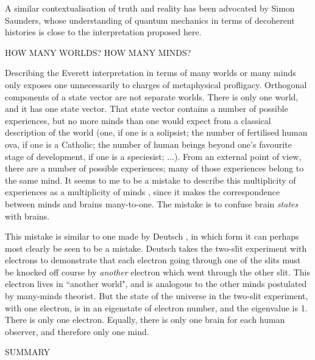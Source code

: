 \documentclass[12pt,a4paper,reqno]{article}
\renewcommand{\(}{\left(}
\renewcommand{\)}{\right)}
\newcommand{\<}{\langle}
\renewcommand{\>}{\rangle}
\theoremstyle{plain} %
\theoremstyle{definition}
\theoremstyle{remark}
\begin{document}
A similar contextualisation of truth and reality has been
advocated by Simon Saunders, whose understanding
of quantum mechanics in terms of decoherent
histories \cite{Saunders:Synthese1, Saunders:Synthese2, 
Saunders:Synthese3} is close to the interpretation proposed here.

\medskip
\begin{center}
HOW MANY WORLDS? HOW MANY MINDS?
\end{center}

Describing the Everett interpretation in terms
of many worlds or many minds only exposes one unnecessarily to charges of
metaphysical profligacy. Orthogonal components of a state vector are not
separate worlds. There is only one world, and it has one state vector.
That state vector contains a number of possible experiences, but no more
minds than one would expect from a classical description of the world
(one, if one is a solipsist; the number of fertilised human ova, if one
is a Catholic; the number of human beings beyond one's favourite stage
of development, if one is a speciesist; ...). From an
external point of view, there are a number of possible experiences; many
of those experiences belong to the same mind. It seems to me to be a
mistake to describe this multiplicity of experiences as a multiplicity of
minds \cite{Lockwood:manyminds, Albert:book, Donald:progress}, since it
makes the correspondence between minds and brains many-to-one. The
mistake is to confuse brain \emph{states} with brains.

This mistake is similar to one made by Deutsch \cite{Deutsch:book}, in
which form it can perhaps most clearly be seen to be a mistake. Deutsch
takes the two-slit experiment with electrons to demonstrate that each
electron going through one of the slits must be knocked off course by
\emph{another} electron which went through the other slit. This electron
lives in ``another world", and is analogous to the other minds
postulated by many-minds theorist. But the state of the universe in
the two-slit experiment, with one electron, is in an eigenstate of
electron number, and the eigenvalue is 1. There is only one electron.
Equally, there is only one brain for each human observer, and therefore
only one mind.

\begin{center}
SUMMARY
\end{center}
\end{document}
